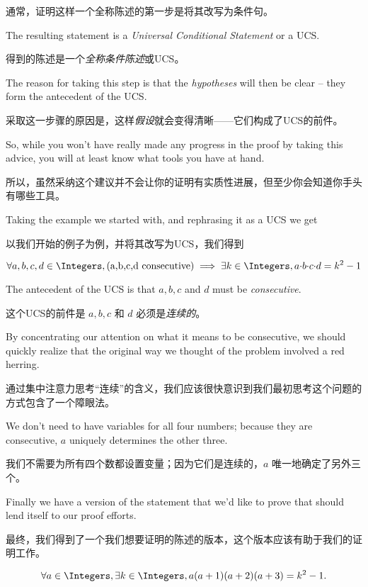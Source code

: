 通常，证明这样一个全称陈述的第一步是将其改写为条件句。

The resulting statement is a
\emph{Universal Conditional Statement}
or a UCS.

得到的陈述是一个\emph{全称条件陈述}或UCS。

The reason for taking
this step is that the \emph{hypotheses} will then be clear -- they form
the antecedent of the UCS.

采取这一步骤的原因是，这样\emph{假设}就会变得清晰——它们构成了UCS的前件。

So, while you won't have really made any
progress in the proof by taking this advice, you will at least know what tools
you have at hand.

所以，虽然采纳这个建议并不会让你的证明有实质性进展，但至少你会知道你手头有哪些工具。

Taking the example we started with, and rephrasing
it as a UCS we get

以我们开始的例子为例，并将其改写为UCS，我们得到

\[ \forall a,b,c,d \in \Integers, (\mbox{a,b,c,d  consecutive})
      \implies \exists k \in \Integers, a{\cdot}b{\cdot}c{\cdot}d = k^2 -1
\]

The antecedent of the UCS is that $a,b,c$ and $d$ must be
      {\em consecutive}.

这个UCS的前件是 $a,b,c$ 和 $d$ 必须是{\em 连续的}。

By concentrating our attention on what it
means to be consecutive, we should quickly realize that the original
way we thought of the problem involved a red herring.

通过集中注意力思考“连续”的含义，我们应该很快意识到我们最初思考这个问题的方式包含了一个障眼法。

We don't need
to have variables for all four numbers; because they are consecutive,
$a$ uniquely determines the other three.

我们不需要为所有四个数都设置变量；因为它们是连续的，$a$ 唯一地确定了另外三个。

Finally we have a version
of the statement that we'd like to prove that should lend itself
to our proof efforts.

最终，我们得到了一个我们想要证明的陈述的版本，这个版本应该有助于我们的证明工作。

\begin{thm}
      \[ \forall a \in \Integers, \exists k \in \Integers,
            a(a+1)(a+2)(a+3) = k^2 - 1. \]
\end{thm}

